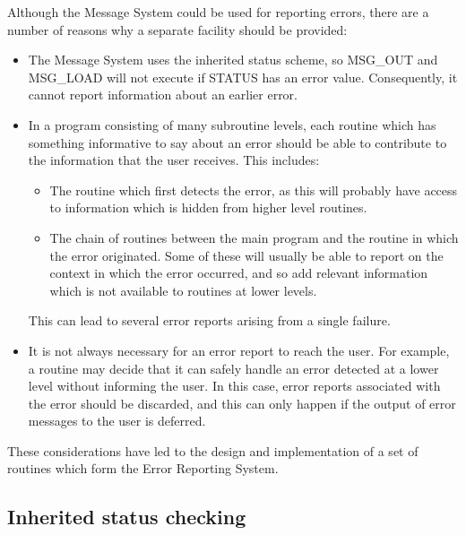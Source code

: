 Although the Message System could be used for reporting errors,
there are a number of reasons why a separate facility should be provided:
\begin {itemize}
\item The Message System uses the inherited status scheme, so MSG\_OUT and
 MSG\_LOAD will not execute if STATUS has an  error value.
 Consequently, it cannot report information about an earlier error.
\item In a program consisting of many subroutine levels, each routine which
 has something informative to say about an error should be able to contribute
 to the information that the user receives.
 This includes:
\begin {itemize}
\item The routine which first detects the error, as this will probably
 have access to information which is hidden from higher level routines.
\item The chain of routines between the main program and the routine in
 which the error originated.
 Some of these will usually be able to report on the context in which the error
 occurred, and so add relevant information which is not available to routines
 at lower levels.
\end {itemize}
 This can lead to several error reports arising from a single failure.
\item It is not always necessary for an error report to reach the user.
 For example, a routine may decide that it can safely handle an error detected
 at a lower level without informing the user.
 In this case, error reports associated with the error should be discarded, and
 this can only happen if the output of error messages to the  user is deferred.
\end {itemize}
These considerations have led to the design and implementation of a set of
routines which form the Error Reporting System.

\subsection{Inherited status checking}

